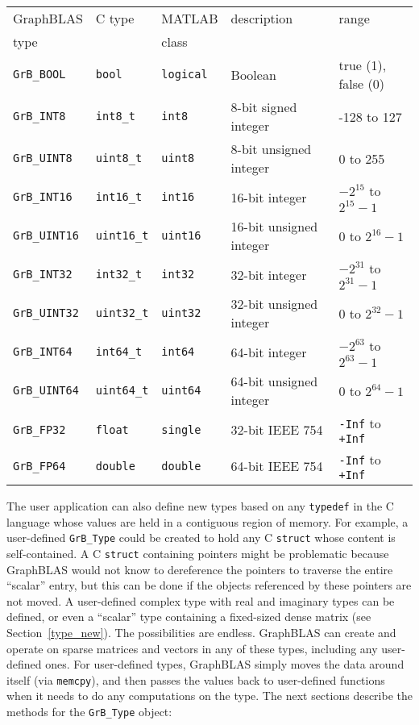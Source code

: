 \documentclass[12pt]{article}
\begin{document}
\vspace{0.2in}
\noindent
{\footnotesize
\begin{tabular}{lllll}
\hline
GraphBLAS         & C type           & MATLAB         & description              & range \\
type              &                  & class          &                          & \\
\hline
\verb'GrB_BOOL'   & \verb'bool'      & \verb'logical' & Boolean                  & true (1), false (0) \\
\hline
\verb'GrB_INT8'   & \verb'int8_t'    & \verb'int8'    & 8-bit signed integer     & -128 to 127 \\
\verb'GrB_UINT8'  & \verb'uint8_t'   & \verb'uint8'   & 8-bit unsigned integer   & 0 to 255 \\
\hline
\verb'GrB_INT16'  & \verb'int16_t'   & \verb'int16'   & 16-bit integer           & $-2^{15}$ to $2^{15}-1$ \\
\verb'GrB_UINT16' & \verb'uint16_t'  & \verb'uint16'  & 16-bit unsigned integer  & 0 to $2^{16}-1$ \\
\hline
\verb'GrB_INT32'  & \verb'int32_t'   & \verb'int32'   & 32-bit integer           & $-2^{31}$ to $2^{31}-1$ \\
\verb'GrB_UINT32' & \verb'uint32_t'  & \verb'uint32'  & 32-bit unsigned integer  & 0 to $2^{32}-1$ \\
\hline
\verb'GrB_INT64'  & \verb'int64_t'   & \verb'int64'   & 64-bit integer           & $-2^{63}$ to $2^{63}-1$ \\
\verb'GrB_UINT64' & \verb'uint64_t'  & \verb'uint64'  & 64-bit unsigned integer  & 0 to $2^{64}-1$ \\
\hline
\verb'GrB_FP32'   & \verb'float'     & \verb'single'  & 32-bit IEEE 754          & \verb'-Inf' to \verb'+Inf'\\
\verb'GrB_FP64'   & \verb'double'    & \verb'double'  & 64-bit IEEE 754          & \verb'-Inf' to \verb'+Inf'\\
\hline
\end{tabular}
}
\vspace{0.2in}

The user application can also define new types based on any \verb'typedef' in
the C language whose values are held in a contiguous region of memory.  For
example, a user-defined \verb'GrB_Type' could be created to hold any C
\verb'struct' whose content is self-contained.  A C \verb'struct' containing
pointers might be problematic because GraphBLAS would not know to dereference
the pointers to traverse the entire ``scalar'' entry, but this can be done if
the objects referenced by these pointers are not moved.  A user-defined complex
type with real and imaginary types can be defined, or even a ``scalar'' type
containing a fixed-sized dense matrix (see Section~\ref{type_new}).  The
possibilities are endless.  GraphBLAS can create and operate on sparse matrices
and vectors in any of these types, including any user-defined ones.  For
user-defined types, GraphBLAS simply moves the data around itself (via
\verb'memcpy'), and then passes the values back to user-defined functions when
it needs to do any computations on the type.  The next sections describe the
methods for the \verb'GrB_Type' object:
\end{document}
